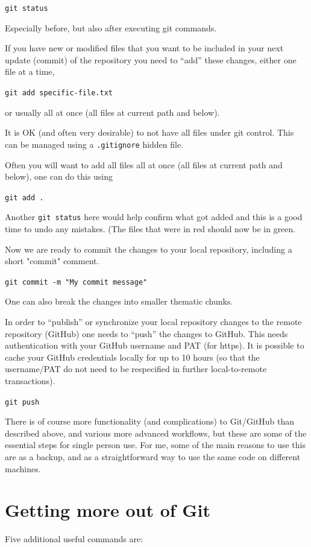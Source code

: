 \texttt{git status}

Especially before, but also after executing git commands.

If you have new or modified files that you want to 
be included in your next update (commit) of the repository you 
need to ``add'' these changes, either one file at a time,

\texttt{git add specific-file.txt}

or usually all at once (all files at current path and below).

It is OK (and often very desirable) to not 
have all files under git control. This can be managed 
using a \texttt{.gitignore} hidden file.

Often you will want to add all 
files all at once (all files at current path and below), one can do this using

\texttt{git add .}

Another \texttt{git status} here would help confirm what got added 
and this is a good time to undo any mistakes. (The files that 
were in red should now be in green.

Now we are ready to commit the changes to your local repository, 
including a short "commit" comment. 

\texttt{git commit -m "My commit message"}

One can also break the changes into smaller thematic chunks.

In order to ``publish'' or synchronize your local repository changes to the 
remote repository (GitHub) one needs to ``push'' the changes to GitHub. This needs 
authentication with your GitHub username and PAT (for https). 
It is possible to cache your GitHub credentials locally for 
up to 10 hours (so that the username/PAT do not need 
to be respecified in further local-to-remote transactions).

\texttt{git push}

There is of course more functionality (and complications) 
to Git/GitHub than described above, and various more 
advanced workflows, but these are some of the essential steps 
for single person use. For me, some of the main reasons to use this 
are as a backup, and as a straightforward way to use 
the same code on different machines.

\section{Getting more out of Git}
Five additional useful commands are:

